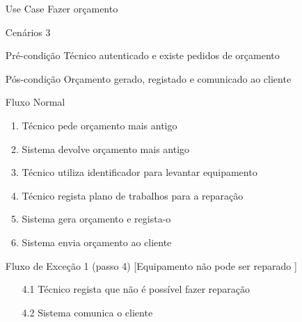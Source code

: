 \documentclass[../relatorio.tex]{subfiles}
\begin{document}
    \begin{itemize}
        \item[Use Case] {Fazer orçamento}
        \item[Cenários] {3} 
        \item[Pré-condição] {Técnico autenticado e existe pedidos de orçamento}
        \item[Pós-condição] {Orçamento gerado, registado e comunicado ao cliente}
        \item[Fluxo Normal] {
            \begin{enumerate}
                \item Técnico pede orçamento mais antigo
                \item Sistema devolve orçamento mais antigo
                \item Técnico utiliza identificador para levantar equipamento
                \item Técnico regista plano de trabalhos para a reparação
                \item Sistema gera orçamento e regista-o
                \item Sistema envia orçamento ao cliente
            \end{enumerate}
        }
        \item[Fluxo de Exceção 1 (passo 4) [Equipamento não pode ser reparado]] {
            \begin{itemize}
                \item[4.1] {Técnico regista que não é possível fazer reparação}
                \item[4.2] {Sistema comunica o cliente}
            \end{itemize}
        }
    \end{itemize}
\end{document}
